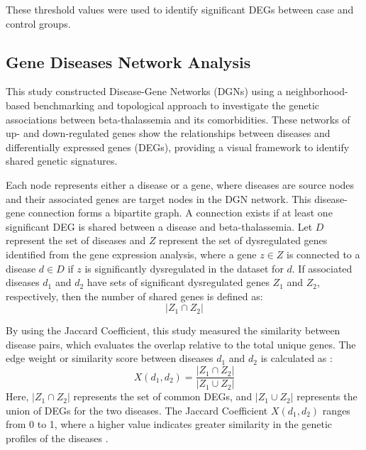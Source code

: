 These threshold values were used to identify significant DEGs between case and control groups.

\vspace*{-\parskip} %
\subsection{Gene Diseases Network Analysis}
\label{sec:sec3_4_3}

This study constructed Disease-Gene Networks (DGNs) using a neighborhood-based benchmarking and topological approach to investigate the genetic associations between beta-thalassemia and its comorbidities. These networks of up- and down-regulated genes show the relationships between diseases and differentially expressed genes (DEGs), providing a visual framework to identify shared genetic signatures.

Each node represents either a disease or a gene, where diseases are source nodes and their associated genes are target nodes in the DGN network. This disease-gene connection forms a bipartite graph. A connection exists if at least one significant DEG is shared between a disease and beta-thalassemia. Let \(D\) represent the set of diseases and \(Z\) represent the set of dysregulated genes identified from the gene expression analysis, where a gene \(z \in Z\) is connected to a disease \(d \in D\) if \(z\) is significantly dysregulated in the dataset for \(d\). If associated diseases \(d_1\) and \(d_2\) have sets of significant dysregulated genes \(Z_1\) and \(Z_2\), respectively, then the number of shared genes is defined as:
\begin{equation}
|Z_1 \cap Z_2|
\label{eq:shared_genes}
\end{equation}

By using the Jaccard Coefficient, this study measured the similarity between disease pairs, which evaluates the overlap relative to the total unique genes. The edge weight or similarity score between diseases \(d_1\) and \(d_2\) is calculated as \cite{b16}:
\begin{equation}
X(d_1, d_2) = \frac{|Z_1 \cap Z_2|}{|Z_1 \cup Z_2|}
\label{eq:jaccard}
\end{equation}
Here, \(|Z_1 \cap Z_2|\) represents the set of common DEGs, and \(|Z_1 \cup Z_2|\) represents the union of DEGs for the two diseases. The Jaccard Coefficient \(X(d_1, d_2)\) ranges from 0 to 1, where a higher value indicates greater similarity in the genetic profiles of the diseases \cite{b20}.

